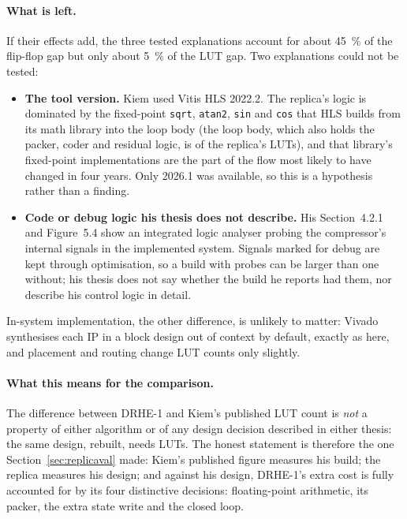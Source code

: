 \paragraph{What is left.} If their effects add, the three tested explanations
account for about \SI{45}{\percent} of the flip-flop gap but only about
\SI{5}{\percent} of the LUT gap. Two explanations could not be tested:
\begin{itemize}
\item \textbf{The tool version.} Kiem used Vitis HLS 2022.2. The replica's
logic is dominated by the fixed-point \texttt{sqrt}, \texttt{atan2},
\texttt{sin} and \texttt{cos} that HLS builds from its math library into the
loop body (the loop body, which also holds the packer, coder and residual
logic, is  of the replica's  LUTs), and that
library's fixed-point implementations are the part of the flow most likely to
have changed in four years. Only 2026.1 was available, so this is a hypothesis
rather than a finding.
\item \textbf{Code or debug logic his thesis does not describe.} His
Section~4.2.1 and Figure~5.4 show an integrated logic analyser probing the
compressor's internal signals in the implemented system. Signals marked for
debug are kept through optimisation, so a build with probes can be larger than
one without; his thesis does not say whether the build he reports had them,
nor describe his control logic in detail.
\end{itemize}
In-system implementation, the other difference, is unlikely to matter: Vivado
synthesises each IP in a block design out of context by default, exactly as
here, and placement and routing change LUT counts only slightly.

\paragraph{What this means for the comparison.} The difference between
DRHE-1 and Kiem's published LUT count is \emph{not} a property of either
algorithm or of any design decision described in either thesis: the same
design, rebuilt, needs  LUTs. The honest statement is therefore
the one Section~\ref{sec:replicaval} made: Kiem's published figure measures
his build; the replica measures his design; and against his design, DRHE-1's extra cost is fully accounted for by its four distinctive decisions:
floating-point arithmetic, its packer, the extra state write and the closed
loop.

